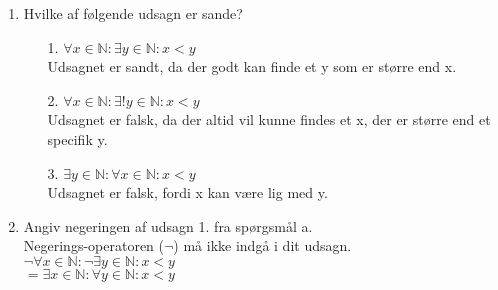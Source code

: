 
\begin{enumerate}[label=(\alph*)] 
\item Hvilke af følgende udsagn er sande?
\begin{enumerate}
\item[1.] $\forall x \in \mathbb{N}: \exists y \in \mathbb{N}: x<y$
\\ Udsagnet er sandt, da der godt kan finde et y som er større end x.
\item[2.] $\forall x \in \mathbb{N}:\exists!y \in \mathbb{N}: x<y$
\\ Udsagnet er falsk, da der altid vil kunne findes et x, der er større end et specifik y.
\item[3.] $\exists y \in \mathbb{N}: \forall x \in \mathbb{N}:x<y$
\\ Udsagnet er falsk, fordi x kan være lig med y.
\end{enumerate}

\item Angiv negeringen af udsagn 1. fra spørgsmål a. 
\\ Negerings-operatoren ($\neg$) må ikke indgå i dit udsagn.
\\ $\neg\forall x \in \mathbb{N}: \neg\exists y \in \mathbb{N}: x<y$ 
\\$=\exists x \in \mathbb{N}: \forall y \in \mathbb{N}: x<y$
\end{enumerate}